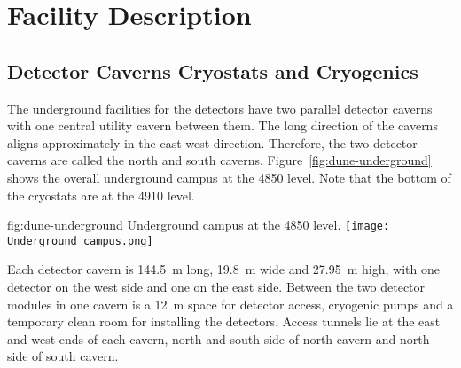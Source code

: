﻿\chapter{Facility Description}
\label{vl:tc-facility}


\section{Detector Caverns Cryostats and Cryogenics}
\label{sec:fdsp-coord-faci-caverns}


The underground facilities for the  detectors have two parallel
detector caverns with one central utility cavern between them. The
long direction of the caverns aligns approximately in the 
east west direction. Therefore, the two detector caverns are called the north
and south caverns. Figure~\ref{fig:dune-underground} shows the overall
underground campus at the  4850 level. Note that the bottom of the cryostats are at the 4910 level.
\begin{dunefigure}{fig:dune-underground}
  {Underground campus at the 4850 level.}
  \texttt{[image: Underground\_campus.png]}
\end{dunefigure}
Each detector cavern is \SI{144.5}{\meter} long, \SI{19.8}{\meter}
wide and \SI{27.95}{\meter} high, with one detector on the west side
and one on the east side. Between the two detector modules in one
cavern is a \SI{12}{\meter} space for detector access, cryogenic pumps and
a temporary clean
room for installing the detectors. Access tunnels lie at the east and
west ends of each cavern, north and south side of north cavern and
north side of south cavern.

